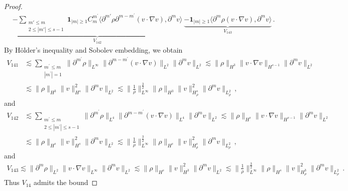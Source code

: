 \documentclass[reqno,11pt]{amsart}
\numberwithin{equation}{section}
\def\no{\nonumber}
\begin{document}
\begin{proof}
\begin{align}
\no & \underset{V_{142}}{\underbrace{-
\sum_{\substack{m'\leq m \\ 2\leq |m'|\leq s-1 }}\mathbf{1}_{|m|\geq 1}C_m^{m^{\prime}}\langle \partial^{m'} \rho \partial^{m - m^{\prime}} (v \cdot \nabla v), \partial^m v \rangle}} \ \underset{ V_{143} }{ \underbrace{ - \mathbf{1}_{|m|\geq 1} \langle \partial^m \rho (v \cdot \nabla v), \partial^m v \rangle}} \,.
	\end{align}
By H\"older's inequality and Sobolev embedding, we obtain
\begin{equation}\label{v-eq141}
	\begin{aligned}
    V_{141}&\lesssim \sum_{\substack{m^\prime \leq m \\ |m^\prime| = 1}} \|\partial^{m^\prime} \rho\|_{L^\infty} \|\partial^{m - m^\prime} (v \cdot \nabla v)\|_{L^2} \|\partial^m v\|_{L^2} \lesssim \|\rho\|_{H^3} \|v \cdot \nabla v\|_{H^{s-1}} \|\partial^m v\|_{L^2} \\
    & \lesssim \|\rho\|_{H^3} \|v\|_{H^s}^2 \|\partial^m v\|_{L^2} \lesssim \|\frac{1}{\rho}\|_{L^\infty}^{\frac{3}{2}} \|\rho\|_{H^3} \|v\|_{H^s_\rho}^2 \|\partial^m v\|_{L_\rho^2} \,,
	\end{aligned}
\end{equation}
and
\begin{equation}\label{v-eq142}
	\begin{aligned}
    V_{142} & \lesssim \sum_{\substack{m^\prime \leq m \\ 2 \leq |m^\prime| \leq s-1}} \|\partial^{m^\prime} \rho\|_{L^4} \|\partial^{m - m^\prime} (v \cdot \nabla v)\|_{L^4} \|\partial^m v\|_{L^2} \lesssim \|\rho\|_{H^s} \|v \cdot \nabla v\|_{H^{s-1}} \|\partial^m v\|_{L^2} \\
    & \lesssim \|\rho\|_{H^s} \|v\|_{H^s}^2 \|\partial^m v\|_{L^2} \lesssim \|\frac{1}{\rho}\|_{L^\infty}^{\frac{3}{2}} \|\rho\|_{H^s} \|v\|_{H^s_\rho}^2 \|\partial^m v\|_{L_\rho^2} \,,
	\end{aligned}
\end{equation}
and
\begin{equation}\label{v-eq143}
	\begin{aligned}
    V_{143} \lesssim \|\partial^m \rho\|_{L^2} \|v \cdot \nabla v\|_{L^\infty} \|\partial^m v\|_{L^2} \lesssim \|\rho\|_{H^s} \|v\|_{H^3}^2 \|\partial^m v\|_{L^2} \lesssim \|\frac{1}{\rho}\|_{L^\infty}^{\frac{3}{2}} \|\rho\|_{H^s} \|v\|_{H^3_\rho}^2 \|\partial^m v\|_{L_\rho^2} \,.
	\end{aligned}
\end{equation}
Thus $V_{14}$ admits the bound

\end{proof}
\end{document}
